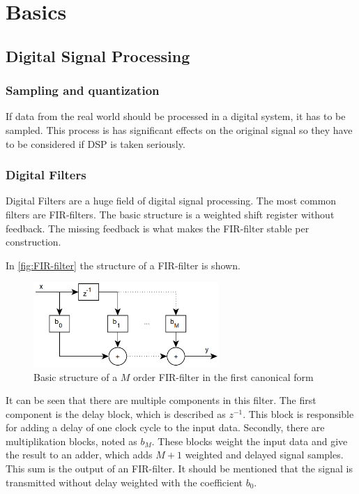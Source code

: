 \section{Basics}

\subsection{Digital Signal Processing}

\subsubsection{Sampling and quantization}

If data from the real world should be processed in a digital system, it has to be sampled.
This process is has significant effects on the original signal so they have to be considered if
\ac{DSP} is taken seriously.

\subsubsection{Digital Filters}


Digital Filters are a huge field of digital signal processing. The most common filters are \ac{FIR}-filters.
The basic structure is a weighted shift register without feedback. The missing feedback is what makes
the \ac{FIR}-filter stable per construction.

In \autoref{fig:FIR-filter} the structure of a \ac{FIR}-filter is shown.

\begin{figure}[!h]
    \centering
    \includegraphics[width=7cm]{img/fir.png}
    \caption{Basic structure of a $M$ order \ac{FIR}-filter in the first canonical form \cite{meyer_signalverarbeitung}}
    \label{fig:FIR-filter}
\end{figure}

It can be seen that there are multiple components in this filter. The first component is the delay block,
which is described as $z^{-1}$. This block is responsible for adding a delay of one clock cycle to the input data.
Secondly, there are multiplikation blocks, noted as $b_M$. These blocks weight the input data and give the
result to an adder, which adds $M+1$ weighted and delayed signal samples. This sum is the output of an
\ac{FIR}-filter. It should be mentioned that the signal is transmitted without delay weighted with the coefficient
$b_0$.

